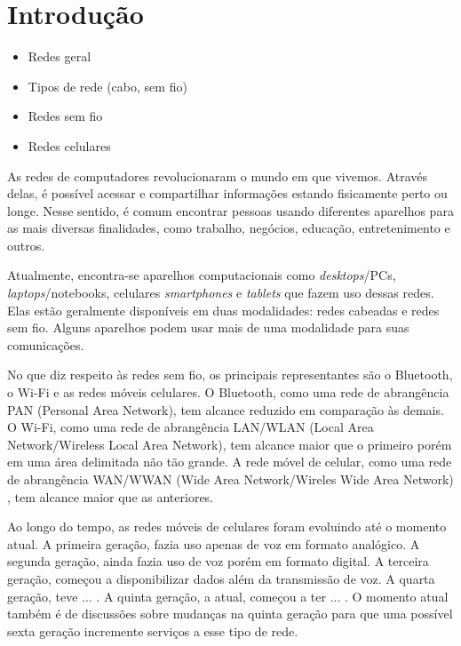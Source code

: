 \documentclass[11pt,oneside,a4paper]{abntex2}
\begin{document}


\maketitle

\section*{Introdução}
\label{intro}


\begin{itemize}
	\item Redes geral
	\item Tipos de rede (cabo, sem fio)
	\item Redes sem fio
	\item Redes celulares
\end{itemize}

As redes de computadores revolucionaram o mundo em que vivemos. Através delas, é possível acessar e compartilhar informações estando fisicamente perto ou longe. Nesse sentido, é comum encontrar pessoas usando diferentes aparelhos para as mais diversas finalidades, como trabalho, negócios, educação, entretenimento e outros.

Atualmente, encontra-se aparelhos computacionais como \textit{desktops}/PCs, \textit{laptops}/notebooks, celulares \textit{smartphones} e \textit{tablets} que fazem uso dessas redes. Elas estão geralmente disponíveis em duas modalidades: redes cabeadas e redes sem fio. Alguns aparelhos podem usar mais de uma modalidade para suas comunicações.

No que diz respeito às redes sem fio, os principais representantes são o Bluetooth, o Wi-Fi e as redes móveis celulares. O Bluetooth, como uma rede de abrangência PAN (Personal Area Network), tem alcance reduzido em comparação às demais. O Wi-Fi, como uma rede de abrangência LAN/WLAN (Local Area Network/Wireless Local Area Network), tem alcance maior que o primeiro porém em uma área delimitada não tão grande. A rede móvel de celular, como uma rede de abrangência WAN/WWAN (Wide Area Network/Wireles Wide Area Network) \cite{wwan}, tem alcance maior que as anteriores.

Ao longo do tempo, as redes móveis de celulares foram evoluindo até o momento atual. A primeira geração, fazia uso apenas de voz em formato analógico. A segunda geração, ainda fazia uso de voz porém em formato digital. A terceira geração, começou a disponibilizar dados além da transmissão de voz. A quarta geração, teve ... . A quinta geração, a atual, começou a ter ... . O momento atual também é de discussões sobre mudanças na quinta geração para que uma possível sexta geração incremente serviços a esse tipo de rede.
\end{document}
